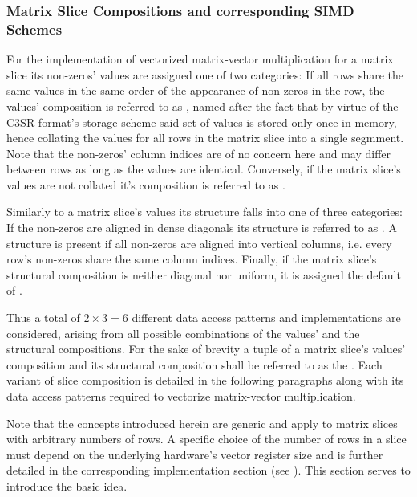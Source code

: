       \subsubsection{Matrix Slice Compositions and corresponding SIMD Schemes}

        For the implementation of vectorized matrix-vector multiplication for a matrix slice its non-zeros' values are
        assigned one of two categories: If all rows share the same values in the same order of the appearance of
        non-zeros in the row, the values' composition is referred to as , named after the fact that by
        virtue of the C3SR-format's storage scheme said set of values is stored only once in memory, hence collating the
        values for all rows in the matrix slice into a single segmment. Note that the non-zeros' column indices are of
        no concern here and may differ between rows as long as the values are identical. Conversely, if the matrix
        slice's values are not collated it's composition is referred to as .

        Similarly to a matrix slice's values its structure falls into one of three categories: If the non-zeros are
        aligned in dense diagonals its structure is referred to as . A  structure is
        present if all non-zeros are aligned into vertical columns, i.e. every row's non-zeros share the same column
        indices. Finally, if the matrix slice's structural composition is neither diagonal nor uniform, it is assigned
        the default of .

        Thus a total of $2 \times 3 = 6$ different data access patterns and implementations are considered, arising from
        all possible combinations of the values' and the structural compositions. For the sake of brevity a tuple of a
        matrix slice's values' composition and its structural composition shall be referred to as the . Each variant of slice composition is detailed in the following paragraphs along with its data
        access patterns required to vectorize matrix-vector multiplication.

        Note that the concepts introduced herein are generic and apply to matrix slices with arbitrary numbers of rows.
        A specific choice of the number of rows in a slice must depend on the underlying hardware's vector register size
        and is further detailed in the corresponding implementation section (see ). This
        section serves to introduce the basic idea.

